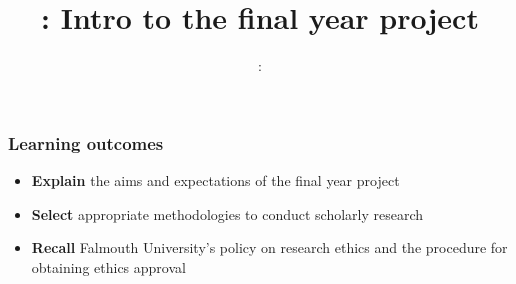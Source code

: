 \usepackage{../../beamerthemeFalmouthGamesAcademy}
\usepackage{multimedia}
\graphicspath{ {../../} }


\usepackage[normalem]{ulem}
\usepackage{wasysym}

\usepackage{algpseudocode}

\usepackage{pdfpages}

\usepackage{fancyvrb}

\usetikzlibrary{arrows,automata}




\title{\sessionnumber: Intro to the final year project}
\subtitle{\modulecode: \moduletitle}

\frame{\titlepage} 

\begin{frame}
	\frametitle{Learning outcomes}
	\begin{itemize}
		\item \textbf{Explain} the aims and expectations of the final year project
		\item \textbf{Select} appropriate methodologies to conduct scholarly research
		\item \textbf{Recall} Falmouth University's policy on research ethics and the procedure for obtaining ethics approval
	\end{itemize}
\end{frame}






